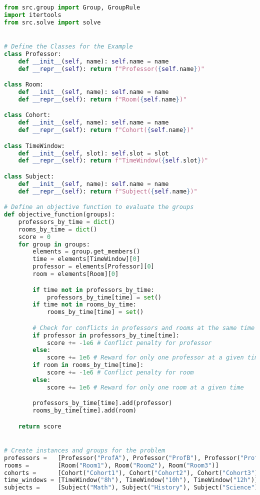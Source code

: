 \begin{lstlisting}[language=Python, caption={Creating and solving the Timetable Scheduling Problem using this framework.}, label={script:time_table}]
from src.group import Group, GroupRule
import itertools
from src.solve import solve


# Define the Classes for the Example
class Professor:
    def __init__(self, name): self.name = name
    def __repr__(self): return f"Professor({self.name})"

class Room:
    def __init__(self, name): self.name = name
    def __repr__(self): return f"Room({self.name})"

class Cohort:
    def __init__(self, name): self.name = name
    def __repr__(self): return f"Cohort({self.name})"

class TimeWindow:
    def __init__(self, slot): self.slot = slot
    def __repr__(self): return f"TimeWindow({self.slot})"

class Subject:
    def __init__(self, name): self.name = name
    def __repr__(self): return f"Subject({self.name})"

# Define an objective function to evaluate the groups
def objective_function(groups):
    professors_by_time = dict()
    rooms_by_time = dict()
    score = 0
    for group in groups:
        elements = group.get_members()
        time = elements[TimeWindow][0]
        professor = elements[Professor][0]
        room = elements[Room][0]

        if time not in professors_by_time:
            professors_by_time[time] = set()
        if time not in rooms_by_time:
            rooms_by_time[time] = set()

        # Check for conflicts in professors and rooms at the same time
        if professor in professors_by_time[time]:
            score += -1e6 # Conflict penalty for professor
        else:
            score += 1e6 # Reward for only one professor at a given time
        if room in rooms_by_time[time]:
            score += -1e6 # Conflict penalty for room
        else:
            score += 1e6 # Reward for only one room at a given time

        professors_by_time[time].add(professor)
        rooms_by_time[time].add(room)

    return score


# Create instances and groups for the problem
professors =   [Professor("ProfA"), Professor("ProfB"), Professor("ProfC")]
rooms =        [Room("Room1"), Room("Room2"), Room("Room3")]
cohorts =      [Cohort("Cohort1"), Cohort("Cohort2"), Cohort("Cohort3")]
time_windows = [TimeWindow("8h"), TimeWindow("10h"), TimeWindow("12h")]
subjects =     [Subject("Math"), Subject("History"), Subject("Science")]


\end{lstlisting}
